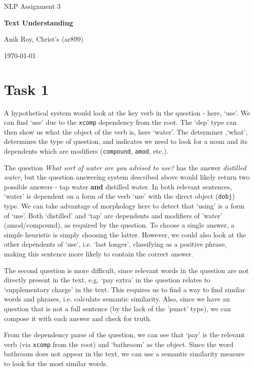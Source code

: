 \documentclass[12pt,a4paper]{article}
\begin{document}
\centerline{\large NLP Assignment 3}
\vspace{0.2in}
\centerline{\Large\bf Text Understanding}
\vspace{0.1in}
\centerline{\large {Anik Roy, Christ's (ar899)}}
\vspace{0.1in}
\centerline{\large {\today}}
\vspace{0.05in}


\section*{Task 1}


A hypothetical system would look at the key verb in the question - here, `use'. We can find `use' due to the \texttt{xcomp} dependency from the root. The `dep' type can then show us what the object of the verb is, here `water'. The determiner ,`what', determines the type of question, and indicates we need to look for a noun and its dependents which are modifiers (\texttt{compound}, \texttt{amod}, etc.).

The question \textit{What sort of water are you advised to use?} has the answer \textit{distilled water}, but the question answering system described above would likely return two possible answers - tap water \textbf{and} distilled water. In both relevant sentences, `water' is dependent on a form of the verb `use' with the direct object (\texttt{dobj}) type. We can take advantage of morphology \cite{NLP_lec2} here to detect that `using' is a form of `use'. Both `distilled' and `tap' are dependents and modifiers of 'water' (amod/compound), as required by the question. To choose a single answer, a simple heuristic is simply choosing the latter. However, we could also look at the other dependents of `use', i.e. `last longer', classifying as a positive phrase, making this sentence more likely to contain the correct answer.

The second question is more difficult, since relevant words in the question are not directly present in the text, e.g. `pay extra' in the question relates to `supplementary charge' in the text. This requires us to find a way to find similar words and phrases, i.e. calculate semantic similarity. Also, since we have an question that is not a full sentence (by the lack of the 'punct' type), we can compose it with each answer and check for truth.

From the dependency parse of the question, we can see that `pay' is the relevant verb (via \texttt{xcomp} from the root) and `bathroom' as the object. Since the word bathroom does not appear in the text, we can use a semantic similarity measure to look for the most similar words.
\end{document}
